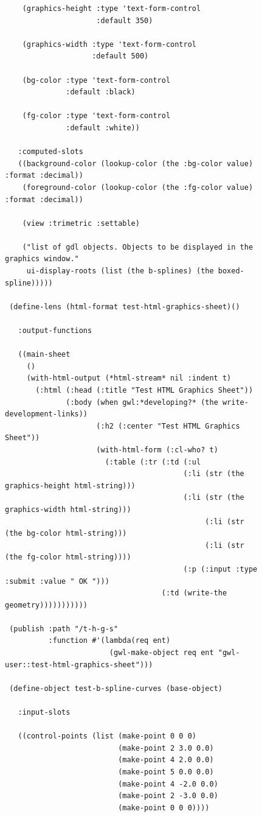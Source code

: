\documentclass [11pt]{book}
\begin{document}
\begin{itemize}
\begin{figure}
\begin{lrbox}{\boxedverb}
\begin{minipage}{\linewidth}
{\begin{verbatim}
    (graphics-height :type 'text-form-control
                     :default 350)
   
    (graphics-width :type 'text-form-control
                    :default 500)
   
    (bg-color :type 'text-form-control
              :default :black)
   
    (fg-color :type 'text-form-control
              :default :white))
     
   :computed-slots
   ((background-color (lookup-color (the :bg-color value) :format :decimal))
    (foreground-color (lookup-color (the :fg-color value) :format :decimal))
     
    (view :trimetric :settable)
   
    ("list of gdl objects. Objects to be displayed in the graphics window."
     ui-display-roots (list (the b-splines) (the boxed-spline)))))

 (define-lens (html-format test-html-graphics-sheet)()
   
   :output-functions

   ((main-sheet
     ()
     (with-html-output (*html-stream* nil :indent t)
       (:html (:head (:title "Test HTML Graphics Sheet"))
              (:body (when gwl:*developing?* (the write-development-links))
                     (:h2 (:center "Test HTML Graphics Sheet"))
                     (with-html-form (:cl-who? t)
                       (:table (:tr (:td (:ul 
                                         (:li (str (the graphics-height html-string)))
                                         (:li (str (the graphics-width html-string)))
                                              (:li (str (the bg-color html-string)))
                                              (:li (str (the fg-color html-string))))
                                         (:p (:input :type :submit :value " OK ")))
                                    (:td (write-the geometry)))))))))))

 (publish :path "/t-h-g-s"
          :function #'(lambda(req ent)
                        (gwl-make-object req ent "gwl-user::test-html-graphics-sheet")))

 (define-object test-b-spline-curves (base-object)

   :input-slots

   ((control-points (list (make-point 0 0 0)
                          (make-point 2 3.0 0.0) 
                          (make-point 4 2.0 0.0) 
                          (make-point 5 0.0 0.0) 
                          (make-point 4 -2.0 0.0) 
                          (make-point 2 -3.0 0.0) 
                          (make-point 0 0 0))))
  

\end{verbatim}}
\end{minipage}
\end{lrbox}
\end{figure}
\end{itemize}
\end{document}
